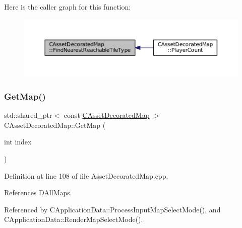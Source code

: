 Here is the caller graph for this function\+:\nopagebreak
\begin{figure}[H]
\begin{center}
\leavevmode
\includegraphics[width=350pt]{classCAssetDecoratedMap_a9e9eed95b427443d196b56b852cdeb9d_icgraph}
\end{center}
\end{figure}
\hypertarget{classCAssetDecoratedMap_afafb067884070fe0340f8b7e63bdc099}{}\label{classCAssetDecoratedMap_afafb067884070fe0340f8b7e63bdc099} 
\subsubsection{\texorpdfstring{Get\+Map()}{GetMap()}}
{\footnotesize\ttfamily std\+::shared\+\_\+ptr$<$ const \hyperlink{classCAssetDecoratedMap}{C\+Asset\+Decorated\+Map} $>$ C\+Asset\+Decorated\+Map\+::\+Get\+Map (\begin{DoxyParamCaption}\item[{int}]{index }\end{DoxyParamCaption})\hspace{0.3cm}{\ttfamily [static]}}



Definition at line 108 of file Asset\+Decorated\+Map.\+cpp.



References D\+All\+Maps.



Referenced by C\+Application\+Data\+::\+Process\+Input\+Map\+Select\+Mode(), and C\+Application\+Data\+::\+Render\+Map\+Select\+Mode().



